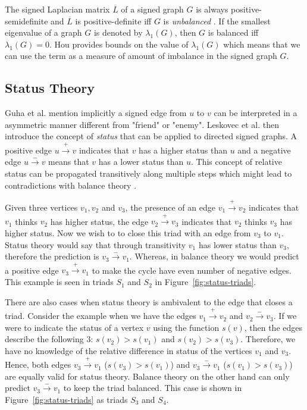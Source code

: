 The signed Laplacian matrix $\overline{L}$ of a signed graph $G$ is always positive-semidefinite and $\overline{L}$ is positive-definite iff $G$ is \textit{unbalanced} \cite{kunegis2010spectral,hou2005bounds,zaslavsky1982signed}. If the smallest eigenvalue of a graph $G$ is denoted by $\lambda_{1}(G)$, then $G$ is balanced iff $\lambda_{1}(G)=0$. Hou \cite{hou2005bounds} provides bounds on the value of $\lambda_{1}(G)$ which means that we can use the term as a measure of amount of imbalance in the signed graph $G$.

\subsection{Status Theory}
\label{sec:status-theory}
Guha et al. \cite{guha2004propagation} mention implicitly a signed edge from $u$ to $v$ can be interpreted in a asymmetric manner different from "friend" or "enemy". Leskovec et al. \cite{leskovec2010signed,leskovec2010predicting} then introduce the concept of \textit{status} that can be applied to directed signed graphs. A positive edge $u \xrightarrow{+} v$ indicates that $v$ has a higher status than $u$ and a negative edge $u \xrightarrow{-} v$ means that $v$ has a lower status than $u$. This concept of relative status can be propagated transitively along multiple steps which might lead to contradictions with balance theory \cite{leskovec2010signed}.

Given three vertices $v_1,v_2$ and $v_3$, the presence of an edge $v_1 \xrightarrow{+} v_2$ indicates that $v_1$ thinks $v_2$ has higher status, the edge $v_2 \xrightarrow{+} v_3$ indicates that $v_2$ thinks $v_3$ has higher status. Now we wish to to close this triad with an edge from $v_3$ to $v_1$. Status theory would say that through transitivity $v_1$ has lower status than $v_3$, therefore the prediction is $v_3 \xrightarrow{-} v_1$. Whereas, in balance theory we would predict a positive edge $v_3 \xrightarrow{+} v_1$ to make the cycle have even number of negative edges. This example is seen in triads $S_1$ and $S_2$ in Figure~\ref{fig:status-triads}.

There are also cases when status theory is ambivalent to the edge that closes a triad. Consider the example when we have the edges $v_1 \xrightarrow{+} v_2$ and $v_2 \xrightarrow{-} v_3$. If we were to indicate the status of a vertex $v$ using the function $s(v)$, then the edges describe the following 3: $s(v_2)>s(v_1) $ and $s(v_2)>s(v_3)$. Therefore, we have no knowledge of the relative difference in status of the vertices $v_1$ and $v_3$. Hence, both edges $v_3 \xrightarrow{+} v_1$ ($s(v_3) > s(v_1)$) and $v_3 \xrightarrow{-} v_1$ ($s(v_1) > s(v_3)$) are equally valid for status theory. Balance theory on the other hand can only predict $v_3 \xrightarrow{-} v_1$ to keep the triad balanced. This case is shown in Figure~\ref{fig:status-triads} as triads $S_3$ and $S_4$.


